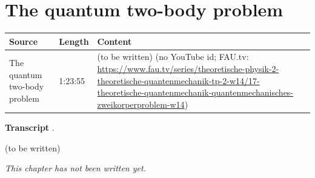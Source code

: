 \chapter{The quantum two-body problem}\label{ch:c17}
\begin{paracol}{2}

\begin{sources}
\begin{tabularx}{\linewidth}{@{}l l L@{}}
\toprule
\textbf{Source} & \textbf{Length} & \textbf{Content}\\
\midrule
The quantum two-body problem & 1:23:55 & (to be written) (no YouTube id; FAU.tv: \url{https://www.fau.tv/series/theoretische-physik-2-theoretische-quantenmechanik-tp-2-w14/17-theoretische-quantenmechanik-quantenmechanisches-zweikorperproblem-w14})\\
\bottomrule
\end{tabularx}

\smallskip
\textbf{Transcript} .
\end{sources}

\begin{reading}
(to be written)
\end{reading}

\emph{This chapter has not been written yet.}

\flushside
\end{paracol}
